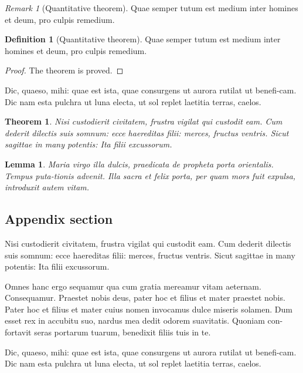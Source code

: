 \documentclass{jdsart}
\theoremstyle{plain}
\newtheorem{thm}{Theorem}
\newtheorem{lemma}{Lemma}
\theoremstyle{remark}
\newtheorem{remark}{Remark}
\theoremstyle{definition}
\newtheorem{defin}{Definition}
\begin{document}
\begin{remark}[Quantitative theorem] Quae semper tutum est medium inter homines et deum, 
pro culpis remedium.
\end{remark}

\begin{defin}[Quantitative theorem] Quae semper tutum est medium inter homines et deum, 
pro culpis remedium.
\end{defin}

\begin{proof}
The theorem is proved.
\end{proof}

Dic, quaeso, mihi: quae est ista, quae consurgens ut aurora rutilat
ut benefi-cam.  Dic nam esta pulchra ut luna electa, ut sol replet
laetitia terras, caelos.

\begin{thm}
Nisi custodierit civitatem,
frustra vigilat qui custodit eam. Cum dederit dilectis suis somnum:
ecce haereditas filii: merces, fructus ventris. Sicut sagittae in
many potentis: Ita filii excussorum.
\end{thm}

\begin{lemma}
Maria virgo illa dulcis, praedicata de
propheta porta orientalis. Tempus puta-tionis advenit. Illa sacra et
felix porta, per quam mors fuit expulsa, introduxit autem vitam.
\end{lemma}


\begin{appendix}

\section{Appendix section}

Nisi custodierit civitatem,
frustra vigilat qui custodit eam. Cum dederit dilectis suis somnum:
ecce haereditas filii: merces, fructus ventris. Sicut sagittae in
many potentis: Ita filii excussorum.

\end{appendix}

\begin{acknowledgement}[title={Acknowledgments}]
Omnes hanc ergo sequamur qua cum gratia mereamur vitam aeternam.
Consequamur. Praestet nobis deus, pater hoc et filius et mater
praestet nobis.  Pater hoc et filius et mater cuius nomen invocamus
dulce miseris solamen. Dum esset rex in accubitu suo, nardus mea
dedit odorem suavitatis. Quoniam con-fortavit seras portarum tuarum,
benedixit filiis tuis in te.
\end{acknowledgement}

\begin{funding}
Dic, quaeso, mihi: quae est ista, quae consurgens ut aurora rutilat
ut benefi-cam.  Dic nam esta pulchra ut luna electa, ut sol replet
laetitia terras, caelos.
\end{funding}



\end{document}
